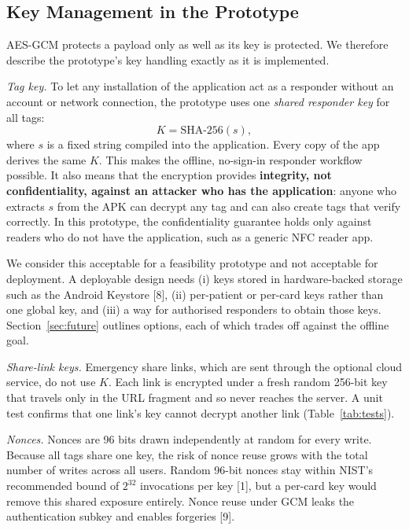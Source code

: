 \subsection{Key Management in the Prototype}
\label{sec:key}

AES-GCM protects a payload only as well as its key is protected. We
therefore describe the prototype's key handling exactly as it is implemented.

\emph{Tag key.} To let any installation of the application act as a
responder without an account or network connection, the prototype uses one
\emph{shared responder key} for all tags:
\begin{equation}
K = \mathrm{SHA\text{-}256}(s),
\label{eq:key}
\end{equation}
where $s$ is a fixed string compiled into the application. Every copy of the
app derives the same $K$. This makes the offline, no-sign-in responder
workflow possible. It also means that the encryption provides
\textbf{integrity, not confidentiality, against an attacker who has the
application}: anyone who extracts $s$ from the APK can decrypt any tag and
can also create tags that verify correctly. In this prototype, the
confidentiality guarantee holds only against readers who do not have the
application, such as a generic NFC reader app.

We consider this acceptable for a feasibility prototype and not acceptable
for deployment. A deployable design needs (i) keys stored in hardware-backed
storage such as the Android Keystore [8], (ii) per-patient or per-card keys
rather than one global key, and (iii) a way for authorised responders to
obtain those keys. Section~\ref{sec:future} outlines options, each of which
trades off against the offline goal.

\emph{Share-link keys.} Emergency share links, which are sent through the
optional cloud service, do not use $K$. Each link is encrypted under a fresh
random 256-bit key that travels only in the URL fragment and so never reaches
the server. A unit test confirms that one link's key cannot decrypt another
link (Table~\ref{tab:tests}).

\emph{Nonces.} Nonces are 96 bits drawn independently at random for every
write. Because all tags share one key, the risk of nonce reuse grows with the
total number of writes across all users. Random 96-bit nonces stay within
NIST's recommended bound of $2^{32}$ invocations per key [1], but a per-card
key would remove this shared exposure entirely. Nonce reuse under GCM leaks
the authentication subkey and enables forgeries [9].

